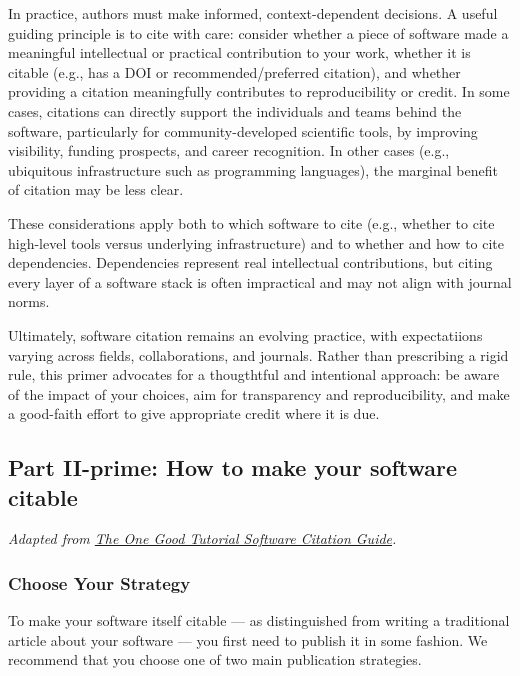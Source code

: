 \documentclass[twocolumn]{openjournal}
\begin{document}
In practice, authors must make informed, context-dependent decisions. A useful guiding principle is to cite with care: consider whether a piece of software made a meaningful intellectual or practical contribution to your work, whether it is citable (e.g., has a DOI or recommended/preferred citation), and whether providing a citation meaningfully contributes to reproducibility or credit. In some cases, citations can directly support the individuals and teams behind the software, particularly for community-developed scientific tools, by improving visibility, funding prospects, and career recognition. In other cases (e.g., ubiquitous infrastructure such as programming languages), the marginal benefit of citation may be less clear.

These considerations apply both to which software to cite (e.g., whether to cite high-level tools versus underlying infrastructure) and to whether and how to cite dependencies. Dependencies represent real intellectual contributions, but citing every layer of a software stack is often impractical and may not align with journal norms.

Ultimately, software citation remains an evolving practice, with expectatiions varying across fields, collaborations, and journals. Rather than prescribing a rigid rule, this primer advocates for a thougthtful and intentional approach: be aware of the impact of your choices, aim for transparency and reproducibility, and make a good-faith effort to give appropriate credit where it is due.



\newpage 








\subsection{Part II-prime: How to make your software citable}

\textit{Adapted from \href{https://onegoodtutorial.org/in-depth/software-citation/}{The One Good Tutorial Software Citation Guide}.}

\subsubsection{Choose Your Strategy}

To make your software itself citable --- as distinguished from writing a traditional article 
about your software --- you first need to publish it in some fashion. We recommend that you choose one of two main publication strategies.
\end{document}

